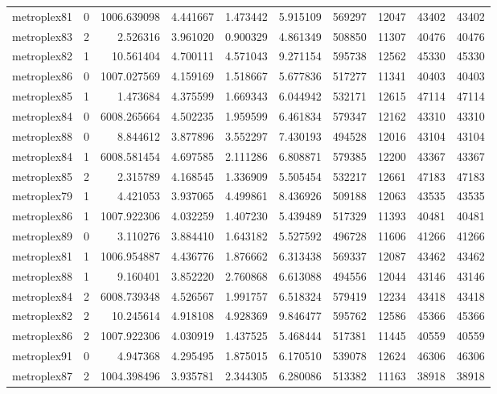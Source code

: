 \documentclass[../../../thesis.tex]{subfiles}
\begin{document}
\begin{longtable}{|l|r|r|r|r|r|r|r|r|r|}
metroplex81 & 0 & 1006.639098 & 4.441667 & 1.473442 & 5.915109 & 569297 & 12047 & 43402 & 43402 \\
metroplex83 & 2 & 2.526316 & 3.961020 & 0.900329 & 4.861349 & 508850 & 11307 & 40476 & 40476 \\
metroplex82 & 1 & 10.561404 & 4.700111 & 4.571043 & 9.271154 & 595738 & 12562 & 45330 & 45330 \\
metroplex86 & 0 & 1007.027569 & 4.159169 & 1.518667 & 5.677836 & 517277 & 11341 & 40403 & 40403 \\
metroplex85 & 1 & 1.473684 & 4.375599 & 1.669343 & 6.044942 & 532171 & 12615 & 47114 & 47114 \\
metroplex84 & 0 & 6008.265664 & 4.502235 & 1.959599 & 6.461834 & 579347 & 12162 & 43310 & 43310 \\
metroplex88 & 0 & 8.844612 & 3.877896 & 3.552297 & 7.430193 & 494528 & 12016 & 43104 & 43104 \\
metroplex84 & 1 & 6008.581454 & 4.697585 & 2.111286 & 6.808871 & 579385 & 12200 & 43367 & 43367 \\
metroplex85 & 2 & 2.315789 & 4.168545 & 1.336909 & 5.505454 & 532217 & 12661 & 47183 & 47183 \\
metroplex79 & 1 & 4.421053 & 3.937065 & 4.499861 & 8.436926 & 509188 & 12063 & 43535 & 43535 \\
metroplex86 & 1 & 1007.922306 & 4.032259 & 1.407230 & 5.439489 & 517329 & 11393 & 40481 & 40481 \\
metroplex89 & 0 & 3.110276 & 3.884410 & 1.643182 & 5.527592 & 496728 & 11606 & 41266 & 41266 \\
metroplex81 & 1 & 1006.954887 & 4.436776 & 1.876662 & 6.313438 & 569337 & 12087 & 43462 & 43462 \\
metroplex88 & 1 & 9.160401 & 3.852220 & 2.760868 & 6.613088 & 494556 & 12044 & 43146 & 43146 \\
metroplex84 & 2 & 6008.739348 & 4.526567 & 1.991757 & 6.518324 & 579419 & 12234 & 43418 & 43418 \\
metroplex82 & 2 & 10.245614 & 4.918108 & 4.928369 & 9.846477 & 595762 & 12586 & 45366 & 45366 \\
metroplex86 & 2 & 1007.922306 & 4.030919 & 1.437525 & 5.468444 & 517381 & 11445 & 40559 & 40559 \\
metroplex91 & 0 & 4.947368 & 4.295495 & 1.875015 & 6.170510 & 539078 & 12624 & 46306 & 46306 \\
metroplex87 & 2 & 1004.398496 & 3.935781 & 2.344305 & 6.280086 & 513382 & 11163 & 38918 & 38918 \\

\end{longtable}
\end{document}
